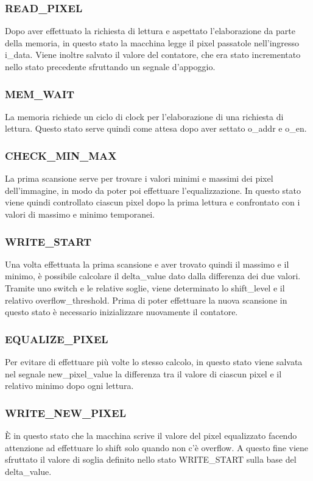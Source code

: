 \documentclass{article}
\begin{document}
\subsubsection{READ\_PIXEL}
Dopo aver effettuato la richiesta di lettura e aspettato l'elaborazione da parte della memoria, in questo stato la macchina legge il pixel passatole nell'ingresso i\_data. Viene inoltre salvato il valore del contatore, che era stato incrementato nello stato precedente sfruttando un segnale d'appoggio.

\subsubsection{MEM\_WAIT}
La memoria richiede un ciclo di clock per l'elaborazione di una richiesta di lettura. Questo stato serve quindi come attesa dopo aver settato o\_addr e o\_en.

\subsubsection{CHECK\_MIN\_MAX}
La prima scansione serve per trovare i valori minimi e massimi dei pixel dell'immagine, in modo da poter poi effettuare l'equalizzazione. In questo stato viene quindi controllato ciascun pixel dopo la prima lettura e confrontato con i valori di massimo e minimo temporanei.

\subsubsection{WRITE\_START}
Una volta effettuata la prima scansione e aver trovato quindi il massimo e il minimo, è possibile calcolare il delta\_value dato dalla differenza dei due valori. Tramite uno switch e le relative soglie, viene determinato lo shift\_level e il relativo overflow\_threshold. Prima di poter effettuare la nuova scansione in questo stato è necessario inizializzare nuovamente il contatore.

\subsubsection{EQUALIZE\_PIXEL}
Per evitare di effettuare più volte lo stesso calcolo, in questo stato viene salvata nel segnale new\_pixel\_value la differenza tra il valore di ciascun pixel e il relativo minimo dopo ogni lettura.

\subsubsection{WRITE\_NEW\_PIXEL}
È in questo stato che la macchina scrive il valore del pixel equalizzato facendo attenzione ad effettuare lo shift solo quando non c'è overflow. A questo fine viene sfruttato il valore di soglia definito nello stato WRITE\_START sulla base del delta\_value.
\end{document}
